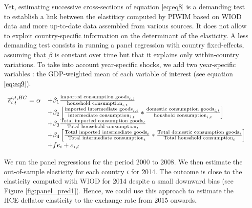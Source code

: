 \documentclass[12pt,a4paper]{paper}
\begin{document}
Yet, estimating successive cross-sections of equation \ref{eq:eq8} is a demanding test to establish a link between the elastiticy computed by PIWIM based on WIOD data and more up-to-date data assembled from various sources.
It does not allow to exploit country-specific information on the determinant of the elasticity.
A less demanding test consists in running a panel regression with country fixed-effects, assuming that $\beta$ is constant over time but that it explains only within-country variations. 
To take into account year-specific shocks, we add two year-specific variables : the GDP-weighted mean of each variable of interest (see equation \ref{eq:eq9}). 


 \begin{equation}
\begin{array}{llll}
\overline{s}_{i,t}^{i,t,HC}= \alpha &+  \beta_1  \frac{\textnormal{imported consumption goods}_{i,t}}{\textnormal{household consumption}_{i,t}} \\
& + \beta_2 \left[ \frac{\textnormal{imported intermediate goods}_{i,t}}{\textnormal{intermediate consumption}_{i,t}}*\frac{\textnormal{domestic consumption goods}_{i,t}}{\textnormal{houshold consumption}_{i,t}}\right] \\ 
&+  \beta_3 \frac{\textnormal{Total imported consumption goods}_t}{\textnormal{Total household consumption}_t} \\
& + \beta_4  \left[ \frac{\textnormal{Total imported intermediate goods}_t}{\textnormal{Total intermediate consumption}_t}*\frac{\textnormal{Total domestic consumption goods}_t}{\textnormal{Total household consumption}_t} \right] \\ 
& +fe_{i}+\varepsilon_{i,t}
\end{array}
\label{eq:eq9}
\end{equation}

We run the panel regressions for the period 2000 to 2008.
We then estimate the out-of-sample elasticity for each country $i$ for 2014. 
The outcome is close to the elasticity computed with WIOD for 2014 despite a small downward bias (see Figure \ref{fig:panel_pred1}).
Hence, we could use this approach to estimate the HCE deflator elasticity to the exchange rate from 2015 onwards.
\end{document}
